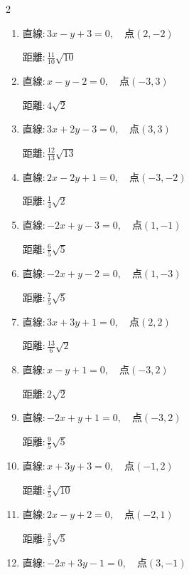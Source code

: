 \begin{multicols}{2}
\begin{enumerate}
        $\displaystyle 距離 : \frac{5}{2}\sqrt{2}$

  \item $直線:3x-y+3=0,\quad 点 ( 2, -2 )$

        $\displaystyle 距離 : \frac{11}{10}\sqrt{10}$

  \item $直線:x-y-2=0,\quad 点 ( -3, 3 )$

        $\displaystyle 距離 : 4\sqrt{2}$

  \item $直線:3x+2y-3=0,\quad 点 ( 3, 3 )$

        $\displaystyle 距離 : \frac{12}{13}\sqrt{13}$

  \item $直線:2x-2y+1=0,\quad 点 ( -3, -2 )$

        $\displaystyle 距離 : \frac{1}{4}\sqrt{2}$

\columnbreak %

  \item $直線:-2x+y-3=0,\quad 点 ( 1, -1 )$

        $\displaystyle 距離 : \frac{6}{5}\sqrt{5}$

  \item $直線:-2x+y-2=0,\quad 点 ( 1, -3 )$

        $\displaystyle 距離 : \frac{7}{5}\sqrt{5}$

  \item $直線:3x+3y+1=0,\quad 点 ( 2, 2 )$

        $\displaystyle 距離 : \frac{13}{6}\sqrt{2}$

  \item $直線:x-y+1=0,\quad 点 ( -3, 2 )$

        $\displaystyle 距離 : 2\sqrt{2}$

  \item $直線:-2x+y+1=0,\quad 点 ( -3, 2 )$

        $\displaystyle 距離 : \frac{9}{5}\sqrt{5}$

  \item $直線:x+3y+3=0,\quad 点 ( -1, 2 )$

        $\displaystyle 距離 : \frac{4}{5}\sqrt{10}$

  \item $直線:2x-y+2=0,\quad 点 ( -2, 1 )$

        $\displaystyle 距離 : \frac{3}{5}\sqrt{5}$

  \item $直線:-2x+3y-1=0,\quad 点 ( 3, -1 )$


\end{enumerate}
\end{multicols}
